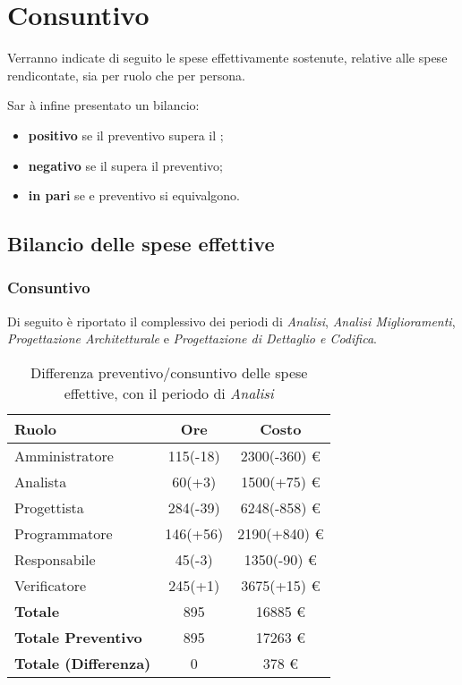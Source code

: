\section{Consuntivo} 
Verranno indicate di seguito le spese effettivamente sostenute, relative alle spese rendicontate, sia per ruolo che per persona.

Sar \`a infine presentato un bilancio:
\begin{itemize}
\item \textbf{positivo} se il preventivo supera il ;
\item \textbf{negativo} se il  supera il preventivo;
\item \textbf{in pari} se  e preventivo si equivalgono.
\end{itemize}

\subsection{Bilancio delle spese effettive}
\subsubsection{Consuntivo}
Di seguito \`e riportato il  complessivo dei periodi di \textit{Analisi}, \textit{Analisi Miglioramenti}, \textit{Progettazione Architetturale} e \textit{Progettazione di Dettaglio e Codifica}.


\begin{table}[H]
	\centering
	\begin{tabular}{ l c c }
		\textbf{Ruolo} & \textbf{Ore} & \textbf{Costo} \\
		\hline
		Amministratore & 115(-18) & 2300(-360) \euro{} \\
		Analista & 60(+3) & 1500(+75) \euro{} \\
		Progettista & 284(-39) & 6248(-858) \euro{} \\
		Programmatore & 146(+56) & 2190(+840) \euro{} \\
		Responsabile & 45(-3) & 1350(-90) \euro{} \\
		Verificatore & 245(+1) & 3675(+15) \euro{} \\
		\hline
		\textbf{Totale \glossaryItem{Consuntivo}} & 895 & 16885 \euro{} \\
		\hline
		\textbf{Totale Preventivo} & 895 & 17263 \euro{} \\
		\hline
		\textbf{Totale (Differenza)} & 0 & 378 \euro{} \\
		\hline
	\end{tabular}
	\caption{Differenza preventivo/consuntivo delle spese effettive, con il periodo di \textit{Analisi}}
\end{table}


